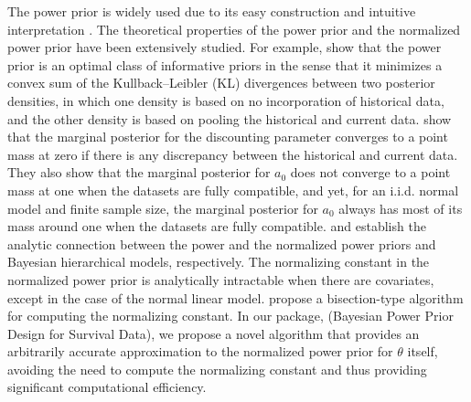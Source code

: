 The power prior is widely used due to its easy construction and intuitive interpretation \citep{ibrahim_2015}. The theoretical properties of the power prior and the normalized power prior have been extensively studied. For example, \cite{ibrahim_2003} show that the power prior is an optimal class of informative priors in the sense that it minimizes a convex sum of the Kullback–Leibler (KL) divergences between two posterior densities, in which one density is based on no incorporation of historical data, and the other density is based on pooling the historical and current data. \cite{shen_2023} show that the marginal posterior for the discounting parameter converges
to a point mass at zero if there is any discrepancy between the historical and current data. They also show that the marginal posterior for $a_0$ does not converge to a point mass at one when the datasets are fully compatible, and yet, for an i.i.d. normal model and finite sample size, the marginal posterior for $a_0$ always has most of its mass around one when the datasets are fully compatible. \cite{chen_2006} and \cite{shen_bhm} establish the analytic connection between the power and the normalized power priors and Bayesian hierarchical models, respectively. The normalizing constant in the normalized power prior is analytically intractable when there are covariates, except in the case of the normal linear model. \cite{Carvalho_Ibrahim_2021} propose a bisection-type algorithm for computing the normalizing constant. In our package,  (Bayesian Power Prior Design for Survival Data), we propose a novel algorithm that provides an arbitrarily accurate approximation to the normalized power prior for $\theta$ itself, avoiding the need to compute the normalizing constant and thus providing significant computational efficiency. 

